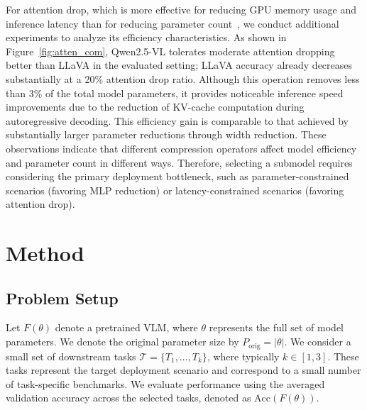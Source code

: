 \documentclass[11pt]{article}
\begin{document}

For attention drop, which is more effective for reducing GPU memory usage and inference latency than for reducing parameter count~\cite{he2024matters,heuncovering}, we conduct additional experiments to analyze its efficiency characteristics. As shown in Figure~\ref{fig:atten_com}, Qwen2.5-VL tolerates moderate attention dropping better than LLaVA in the evaluated setting; LLaVA accuracy already decreases substantially at a 20\% attention drop ratio. Although this operation removes less than 3\% of the total model parameters, it provides noticeable inference speed improvements due to the reduction of KV-cache computation during autoregressive decoding. This efficiency gain is comparable to that achieved by substantially larger parameter reductions through width reduction. These observations indicate that different compression operators affect model efficiency and parameter count in different ways. Therefore, selecting a submodel requires considering the primary deployment bottleneck, such as parameter-constrained scenarios (favoring MLP reduction) or latency-constrained scenarios (favoring attention drop).




\section{Method}

\subsection{Problem Setup}

Let $F(\theta)$ denote a pretrained VLM, where $\theta$ represents the full set of model parameters. We denote the original parameter size by $P_{\mathrm{orig}} = |\theta|$. We consider a small set of downstream tasks $\mathcal{T} = \{T_1, \dots, T_k\}$, where typically $k \in [1,3]$. These tasks represent the target deployment scenario and correspond to a small number of task-specific benchmarks. We evaluate performance using the averaged validation accuracy across the selected tasks, denoted as $\mathrm{Acc}(F(\theta))$.
\end{document}
